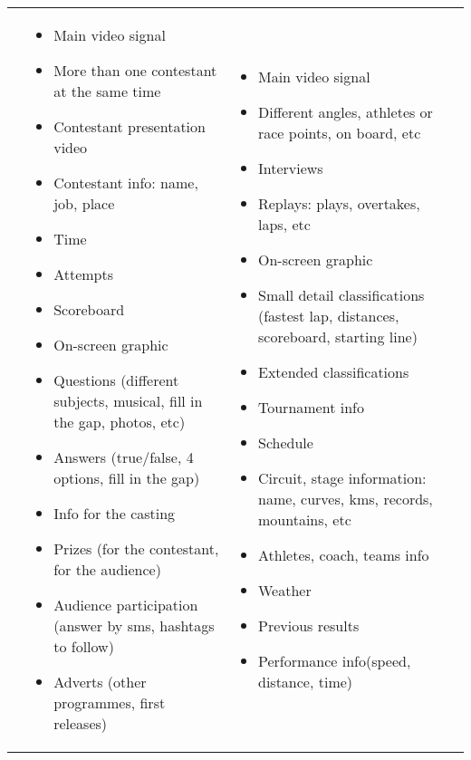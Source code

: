 \begin{table}
\begin{tabular}{||L|L|L|L||}
\begin{itemize}[leftmargin=.1in]
		\end{itemize}
		& 	
		\begin{itemize}[leftmargin=.1in]
			\setlength{\itemsep}{-0.3\baselineskip}
			\item Main video signal
			\item More than one contestant at the same time 
			\item Contestant presentation video 
			\item Contestant info: name, job, place 
			\item Time
			\item Attempts 
			\item Scoreboard 
			\item On-screen graphic 
			\item Questions (different subjects, musical, fill in the gap, photos, etc)
			\item Answers (true/false, 4 options, fill in the gap)    
			\item Info for the casting     
			\item Prizes (for the contestant, for the audience) 
			\item Audience participation (answer by sms, hashtags to follow)  
			\item Adverts (other programmes, first releases)
		\end{itemize}
		& 	
		\begin{itemize}[leftmargin=.1in]
			\setlength{\itemsep}{-0.3\baselineskip}
			\item Main video signal
			\item Different angles, athletes or race points, on board, etc
			\item Interviews
			\item Replays: plays, overtakes, laps, etc 
			\item On-screen graphic
			\item Small detail classifications (fastest lap, distances, scoreboard, starting line)
			\item Extended classifications
			\item Tournament info
			\item Schedule
			\item Circuit, stage information: name, curves, kms, records, mountains, etc
			\item Athletes, coach, teams info
			\item Weather
			\item Previous results
			\item Performance info(speed, distance, time) 

\end{itemize}
\end{tabular}
\end{table}
